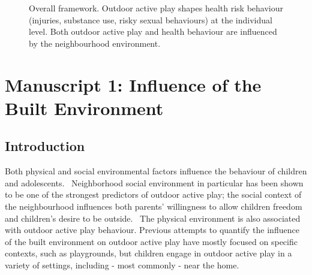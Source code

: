 \documentclass [11pt]{article}
\begin{document}
\begin{figure}[h]
\centering
{}
\caption{Overall framework. Outdoor active play shapes health risk behaviour (injuries, substance use, risky sexual behaviours) at the individual level. Both outdoor active play and health behaviour are influenced by the neighbourhood environment.}
\label{m1fig}
\end{figure}












\section{Manuscript 1: Influence of the Built Environment}
\subsection{Introduction} 

Both physical and social environmental factors influence the behaviour of children and adolescents.~\cite{Glanz2015-of,Barker1968-vn,Moos1980-wh,Bronfenbrenner1977-hj,Glass2006-px,Moore2015-gr} Neighborhood social environment in particular has been shown to be one of the strongest predictors of outdoor active play; the social context of the neighbourhood influences both parents' willingness to allow children freedom and children's desire to be outside.~\cite{Remmers2014-ng} The physical environment is also associated with outdoor active play behaviour. Previous attempts to quantify the influence of the built environment on outdoor active play have mostly focused on specific contexts, such as playgrounds, but children engage in outdoor active play in a variety of settings, including - most commonly - near the home.~\cite{Aarts2012-dt} 
\end{document}
